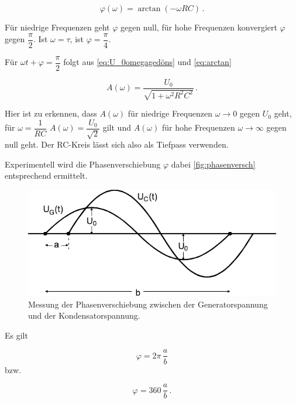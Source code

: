 \begin{equation}
    \varphi (ω) = \arctan(-ω R C) \,.
    \label{eq:arctan}
\end{equation}

Für niedrige Frequenzen geht $\varphi$ gegen null, für hohe Frequenzen konvergiert $\varphi$ gegen $\dfrac{\pi}{2}$.
Ist $\omega = \tau$, ist $\varphi = \dfrac{\pi}{4}$.

Für $\omega t + \varphi  = \dfrac{\pi}{2}$ folgt aus \eqref{eq:U_0omegagedöns} und \eqref{eq:arctan}

\begin{equation}
    A(\omega) = \frac{U_0}{\sqrt{1 + \omega^2 R^2 C^2}} \,.
    \label{eq:amplitudendingens}
\end{equation}

Hier ist zu erkennen, dass $A(\omega)$ für niedrige Frequenzen $\omega \rightarrow 0$ gegen $U_0$ geht, für $\omega = \dfrac{1}{RC}$ $A(\omega) = \dfrac{U_0}{\sqrt{2}}$ gilt und $A(\omega)$ für hohe Frequenzen $\omega \rightarrow \infty$ gegen null geht.
Der RC-Kreis lässt sich also als Tiefpass verwenden.

Experimentell wird die Phasenverschiebung $\varphi$ dabei \autoref{fig:phasenversch} entsprechend ermittelt.

\begin{figure}[H]
    \centering
    \includegraphics{figures/Phasenverschiebung.pdf}
    \caption{Messung der Phasenverschiebung zwischen der Generatorspannung und der Kondensatorspannung\cite{ap08}.}
    \label{fig:phasenversch}
\end{figure}

Es gilt

\begin{equation*}
    \varphi = 2 \pi \,\dfrac{a}{b} 
    \label{eq:phasebogen}
\end{equation*} bzw.

\begin{equation*}
    \varphi = 360 \,\dfrac{a}{b} \,.
    \label{eq:phasegrad}
\end{equation*}

